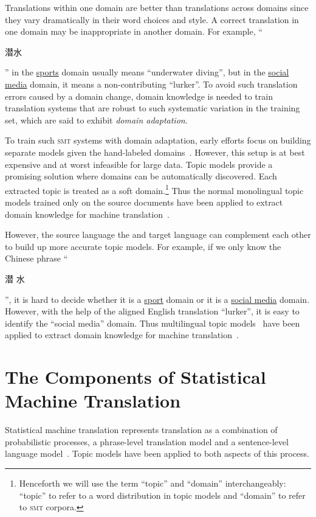 Translations within one domain are better than translations across
domains since they vary dramatically in their word choices and style.
A correct translation in one domain may be inappropriate in another
domain.  For example, ``\begin{CJK*}{UTF8}{gbsn}潜水\end{CJK*}'' in the
  \underline{sports} domain usually means ``underwater diving'', but
  in the \underline{social media} domain, it means a non-contributing
  ``lurker''. To avoid such translation errors caused by a domain
  change, domain knowledge is needed to train translation systems that
  are robust to such systematic variation in the training set, which
  are said to exhibit \emph{domain adaptation}.

To train such \textsc{smt} systems with domain adaptation, early
efforts focus on building separate models given the hand-labeled
domains~\citep{foster-07,matsoukas-09,chiang-11}. However, this setup
is at best expensive and at worst infeasible for large data.  Topic
models provide a promising solution where domains can be automatically
discovered. Each extracted topic is treated as a soft
domain.\footnote{Henceforth we will use the term ``topic'' and
  ``domain'' interchangeably: ``topic'' to refer to  a word distribution in
  topic models and ``domain'' to refer to \textsc{smt} corpora.} Thus
the normal monolingual topic models trained only on the source documents have
been applied to extract domain knowledge for machine
translation~\citep{Eidelman-12}.

However, the source language the and target language can complement
each other to build up more accurate topic models. For example, if we
only know the Chinese phrase ``\begin{CJK*}{UTF8}{gbsn}潜
  水\end{CJK*}'', it is hard to decide whether it is a
  \underline{sport} domain or it is a \underline{social media}
  domain. However, with the help of the aligned English translation
  ``lurker'', it is easy to identify the ``social media'' domain. Thus
  multilingual topic models~\citep{ni-09,DeSmet-09,mimno-09,boyd-graber-10} have been
  applied to extract domain knowledge for machine
  translation~\citep{hu-14}.

\section{The Components of Statistical Machine Translation}

Statistical machine translation represents translation as a
combination of probabilistic processes, a phrase-level translation model and a sentence-level language model~\citep{koehn-03,koehn-09}. 
Topic models have been applied to both aspects of this process.

